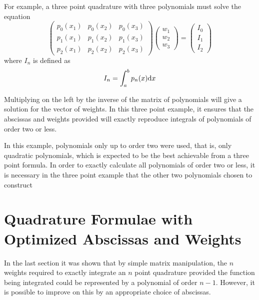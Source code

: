 \documentclass[preprint]{revtex4}
\newcommand{\dx}{{\rm d}x}
\begin{document}
For example, a three point quadrature with three polynomials must solve the
equation
\begin{equation}
\begin{pmatrix}
p_0(x_1) & p_0(x_2) & p_0(x_3) \\
p_1(x_1) & p_1(x_2) & p_1(x_3) \\
p_2(x_1) & p_2(x_2) & p_2(x_3) 
\end{pmatrix}
\begin{pmatrix}
w_1\\
w_2\\
w_3
\end{pmatrix}
=
\begin{pmatrix}
I_0\\
I_1\\
I_2
\end{pmatrix}
\end{equation}
where $I_n$ is defined as
\begin{equation}
I_n=\int_a^bp_n(x)\dx 
\end{equation}

Multiplying on the left by the inverse of the matrix of polynomials will give a solution
for the vector of weights. In this three point example, it ensures that the abscissas
and weights provided will exactly reproduce integrals of polynomials of order two or less. 

In this example, polynomials only up to order two were used, that is, only quadratic
polynomials, which is expected to be the best achievable from a three point formula. In
order to exactly calculate all polynomials of order two or less, it is necessary in 
the three point example that the other two polynomials chosen to construct 

\section{Quadrature Formulae with Optimized Abscissas and Weights}

In the last section it was shown that by simple matrix manipulation, the $n$ weights
required to exactly integrate an $n$ point quadrature provided the function being
integrated could be represented by a polynomial of order $n-1$. However, it is possible
to improve on this by an appropriate choice of abscissas. 
\end{document}
